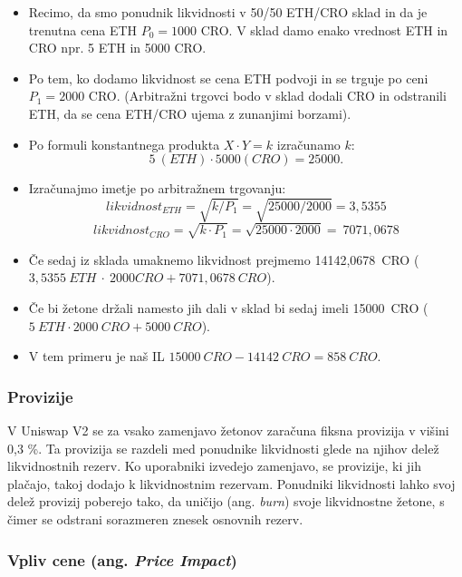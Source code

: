 \documentclass[a4paper,12pt]{article}%
\begin{document}
\begin{itemize}
    \item Recimo, da smo ponudnik likvidnosti v 50/50 ETH/CRO sklad in da je trenutna cena ETH $P_0 = 1000$ CRO. V sklad damo enako vrednost ETH in CRO npr. 5 ETH in 5000 CRO. 
    \item Po tem, ko dodamo likvidnost se cena ETH podvoji in se trguje po ceni $P_1 = 2000$ CRO. (Arbitražni trgovci bodo v sklad dodali CRO in odstranili ETH, da se cena ETH/CRO ujema z zunanjimi borzami).
    \item Po formuli konstantnega produkta $X \cdot Y=k$ izračunamo $k$: $$5~(ETH) \cdot 5000 (CRO) = 25000.$$
    \item Izračunajmo imetje po arbitražnem trgovanju:
        $$likvidnost_{ETH} = \sqrt{k/P_1} = \sqrt{25000/2000}= 3,5355$$
        $$likvidnost_{CRO} = \sqrt{k \cdot P_1} = \sqrt{25000 \cdot 2000}=~7071,0678$$
        
    \item Če sedaj iz sklada umaknemo likvidnost prejmemo 14142,0678~CRO
    ($3,5355~ETH~\cdot~2000 CRO + 7071,0678~CRO$).
    \item Če bi žetone držali namesto jih dali v sklad bi sedaj imeli 15000~CRO ($5~ETH \cdot 2000~CRO + 5000~CRO$).
    \item V tem primeru je naš IL $15000~CRO - 14142~CRO = 858~CRO$.


\end{itemize}

\subsubsection{ Provizije}
V Uniswap V2 se za vsako zamenjavo žetonov zaračuna fiksna provizija v višini 0,3 \%. Ta provizija se razdeli med ponudnike likvidnosti glede na njihov delež likvidnostnih rezerv. Ko uporabniki izvedejo zamenjavo, se provizije, ki jih plačajo, takoj dodajo k likvidnostnim rezervam. Ponudniki likvidnosti lahko svoj delež provizij poberejo tako, da uničijo (ang. \textit{burn}) svoje likvidnostne žetone, s čimer se odstrani sorazmeren znesek osnovnih rezerv.

\subsubsection{Vpliv cene (ang. \textit{Price Impact})}
\end{document}
